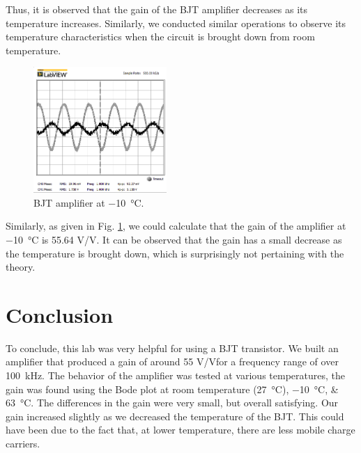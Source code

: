 \documentclass[journal]{IEEEtran}
\begin{document}
Thus, it is observed that the gain of the BJT amplifier decreases as its temperature increases.
Similarly, we conducted similar operations to observe its temperature characteristics when the
circuit is brought down from room temperature.
\begin{figure}[h]
  \includegraphics[width=0.45\textwidth]{images/-10degree.png}
  \caption{BJT amplifier at \SI{-10}{\celsius}.}
  \label{fig-3-3}%
\end{figure}
Similarly, as given in Fig. \ref{fig-3-3}, we could calculate that
the gain of the amplifier at \SI{-10}{\celsius} is 55.64 \si{\volt}/\si{\volt}. It
can be observed that the gain has a small decrease as the temperature is brought down,
which is surprisingly not pertaining with the theory.

\section{Conclusion}
\par To conclude, this lab was very helpful for using a BJT transistor. We built an amplifier that produced a gain of around 55 \si{\volt}/\si{\volt}for a frequency range of over \SI{100}{\kilo\hertz}.
The behavior of the amplifier was tested at various temperatures, the gain was found using the Bode plot at room temperature (\SI{27}{\celsius}), \SIlist{-10;63}{\celsius}. The differences in the gain were very small, but overall satisfying. Our gain increased slightly as we decreased the temperature of the BJT. This could have been due to the fact that, at lower temperature, there are less mobile charge carriers.
\end{document}
